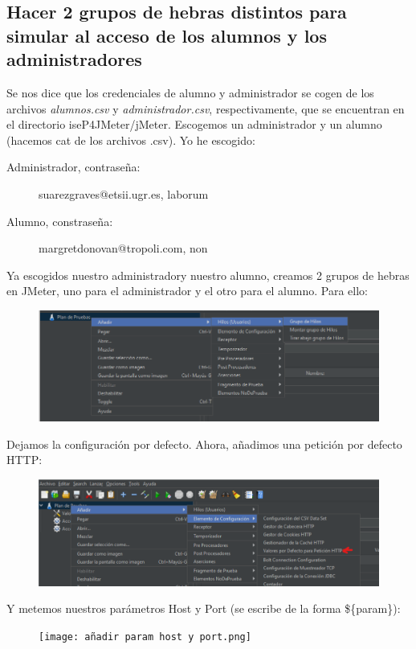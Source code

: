\documentclass[a4paper]{article}
\begin{document}
\subsection{Hacer 2 grupos de hebras distintos para simular al acceso de los alumnos
y los administradores}
Se nos dice que los credenciales de alumno y administrador se cogen de los archivos
\textsl{alumnos.csv} y \textsl{administrador.csv}, respectivamente, que se encuentran en
el directorio iseP4JMeter/jMeter.
Escogemos un administrador y un alumno (hacemos cat de los archivos .csv). Yo he escogido:
\begin{description}
    \item[Administrador, contraseña:] suarezgraves@etsii.ugr.es, laborum
    \item[Alumno, constraseña:] margretdonovan@tropoli.com, non  
\end{description}
Ya escogidos nuestro administradory nuestro alumno, creamos 2 grupos de hebras 
en JMeter, uno para el administrador y el otro para el alumno. Para ello:
\begin{figure}[hbt!]
    \centering
    \includegraphics[width=\textwidth]{crear grupo hilos.png}
\end{figure}
Dejamos la configuración por defecto. \newline
Ahora, añadimos una petición por defecto HTTP:
\newpage
\begin{figure}[hbt!]
    \includegraphics[width=\textwidth]{valores por defecto peticion.png}
\end{figure}
Y metemos nuestros parámetros Host y Port (se escribe de la forma \$\{param\}):
\begin{figure}[hbt!]
    \texttt{[image: añadir param host y port.png]}
\end{figure}
\end{document}

